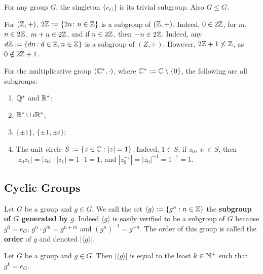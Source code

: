 \begin{remark}
   For any group $G$, the singleton $\{e_G\}$ is its trivial subgroup. Also $G \leq G$.
\end{remark}

\begin{example}
   For $(\mathbb{Z}, +)$, $2\mathbb{Z} := \{2n \colon n \in \mathbb{Z}\}$ is a subgroup of $(\mathbb{Z}, +)$. Indeed, $0 \in 2\mathbb{Z}$, for $m$, $n \in 2\mathbb{Z}$, $m + n \in 2\mathbb{Z}$, and if $n \in 2\mathbb{Z}$, then $-n \in 2\mathbb{Z}$. Indeed, any $d\mathbb{Z} := \{dn \colon d \in \mathbb{Z}, n \in \mathbb{Z}\}$ is a subgroup of $(Z, +)$. However, $2\mathbb{Z} + 1 \not\leq \mathbb{Z}$, as $0 \notin 2\mathbb{Z} + 1$. 
\end{example}

\begin{example}
   For the multiplicative group $(\mathbb{C}^*, \cdot)$, where $\mathbb{C}^* := \mathbb{C} \setminus \{0\}$, the following are all subgroups:
   \begin{enumerate}
      \item $\mathbb{Q}^*$ and $\mathbb{R}^*$;
      \item $\mathbb{R}^* \cup i\mathbb{R}^*$;
      \item $\{\pm1\}$, $\{\pm 1, \pm i\}$; 
      \item The unit circle $S := \{z \in \mathbb{C} : |z| = 1\}$. Indeed, $1 \in S$, if $z_0$, $z_1 \in S$, then $|z_0z_1| = |z_0|\cdot|z_1| = 1 \cdot 1 = 1$, and $|z_0^{-1}| = |z_0|^{-1} = 1^{-1} = 1$. 
   \end{enumerate}
\end{example}

\subsection{Cyclic Groups}

\begin{defbox}
   Let $G$ be a group and $g \in G$. We call the set $\langle g \rangle := \{g^n : n \in \mathbb{Z}\}$ the \textbf{subgroup of $G$ generated by $g$}. Indeed $\langle g \rangle$ is easily verified to be a subgroup of $G$ because $g^0 = e_G$, $g^n \cdot g^m = g^{n + m}$ and $(g^n)^{-1} = g^{-n}$. The order of this group is called the \textbf{order} of $g$ and denoted $|\langle g \rangle|$.  
\end{defbox}

\begin{lemmabox}
   Let $G$ be a group and $g \in G$. Then $|\langle g \rangle|$ is equal to the least $k \in \mathbb{N}^+$ such that $g^k = e_G$. 
\end{lemmabox}